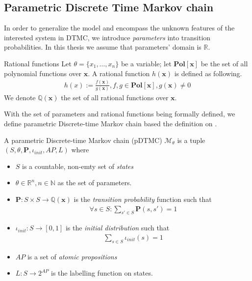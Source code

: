 \subsection{Parametric Discrete Time Markov chain}
In order to generalize the model and encompass the unknown features of the interested system in
DTMC, we introduce \textit{parameters} into transition probabilities. In this thesis we assume that
parameters' domain is $\mathbb{R}$.
\begin{definition}{Rational functions}
      Let $\theta=\{x_1,\ldots,x_n\}$ be a variable; let $\mathbf{Pol}[\mathbf{x}]$ be the set of
      all polynomial functions over $\mathbf{x}$. A rational function $h(\mathbf{x})$ is defined
      as following.
      \begin{align*}
            h(x) := \frac{f(\mathbf{x})}{g(\mathbf{x})}, f,g\in\mathbf{Pol}[\mathbf{x}], g(\mathbf{x}) \neq 0
      \end{align*}
      We denote $\mathbb{Q}(\mathbf{x})$ the set of all rational functions over $\mathbf{x}$.
\end{definition}
With the set of parameters and rational functions being formally defined, we define parametric
Discrete-time Markov chain based the definition on \cite{junges2019parameter}.
\begin{definition}
      A parametric Discrete-time Markov chain (pDTMC) $\mathcal{M}_\theta$ is a tuple $(S, \theta,
            \mathbf{P}, \iota_{init}, AP, L)$ where
      \begin{itemize}
            \item $S$ is a countable, non-emty set of \textit{states}
            \item $\theta \in \mathbb{R}^n, n \in \mathbb{N}$ as the set of  parameters.
            \item $\mathbf{P}:S\times S \rightarrow \mathbb{Q}(\mathbf{x})$ is the \textit{transition
                        probability} function such that
                  \begin{align*}
                        \forall s \in S : \sum_{s'\in S}\mathbf{P}(s, s') = 1
                  \end{align*}
            \item $\iota_{init}: S \rightarrow [0,1]$ is the \textit{initial distribution} such that
                  \begin{align*}
                        \sum_{s\in S}\iota_{init}(s) = 1
                  \end{align*}
            \item $AP$ is a set of \textit{atomic propositions}
            \item $L: S \rightarrow 2^{AP}$ is the labelling function on states.
      \end{itemize}
\end{definition}
